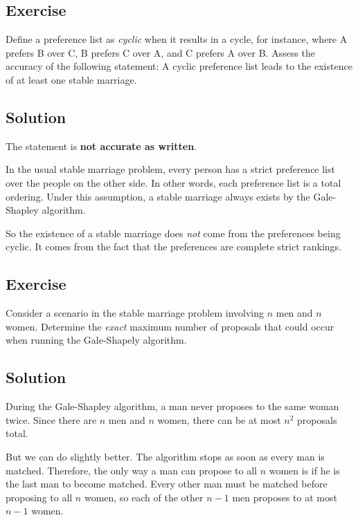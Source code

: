 \documentclass[14pt]{extreport}
\newcounter{counter}
\newcommand{\Exercise}{Exercise \stepcounter{counter}\thecounter}
\begin{document}
\subsection*{\Exercise}
    Define a preference list as \textit{cyclic} when it results in a cycle, for instance, where A prefers B over C, B prefers C over A, and C prefers A over B. Assess the accuracy of the following statement: A cyclic preference list leads to the existence of at least one stable marriage.

\subsection*{Solution}
    The statement is \textbf{not accurate as written}.

    \vspace{2mm}
    In the usual stable marriage problem, every person has a strict preference list over the people on the other side. In other words, each preference list is a total ordering. Under this assumption, a stable marriage always exists by the Gale-Shapley algorithm.

    \vspace{2mm}
    So the existence of a stable marriage does \textit{not} come from the preferences being cyclic. It comes from the fact that the preferences are complete strict rankings.

\subsection*{\Exercise}
    Consider a scenario in the stable marriage problem involving $n$ men and $n$ women. Determine the \textit{exact} maximum number of proposals that could occur when running the Gale-Shapely algorithm.

\subsection*{Solution}
    During the Gale-Shapley algorithm, a man never proposes to the same woman twice. Since there are $n$ men and $n$ women, there can be at most $n^{2}$ proposals total.

    \vspace{2mm}
    But we can do slightly better. The algorithm stops as soon as every man is matched. Therefore, the only way a man can propose to all $n$ women is if he is the last man to become matched. Every other man must be matched before proposing to all $n$ women, so each of the other $n - 1$ men proposes to at most $n - 1$ women.
\end{document}
